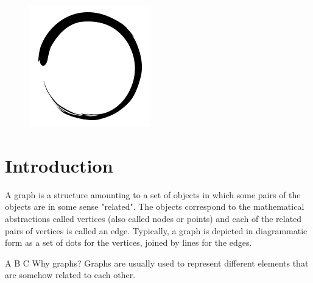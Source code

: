 \documentclass[12pt]{article}
\title{\vspace{-2em}\mytitle\vspace{-0.3em}}
\author{\textbf{Editor}\\Kayacan Vesek\\ \ \\ \textbf{Reviewer} \\Yasin Kaya}
\date{}
\begin{document}
\begin{figure}
  \centering
  \includegraphics[width=\linewidth/4]{inzva-logo.png}
  \label{fig:inzva}
\end{figure}
\maketitle

\cleardoublepage
\tableofcontents
{}
\cleardoublepage
\newcommand{\sectionbreak}{\clearpage}

\section{Introduction}

A graph is a structure amounting to a set of objects in which some pairs of the objects are in some sense "related". The objects correspond to the mathematical abstractions called vertices (also called nodes or points) and each of the related pairs of vertices is called an edge. Typically, a graph is depicted in diagrammatic form as a set of dots for the vertices, joined by lines for the edges. \cite{1}

A B
C
Why graphs? Graphs are usually used to represent different elements that are somehow related to each other.
\end{document}
